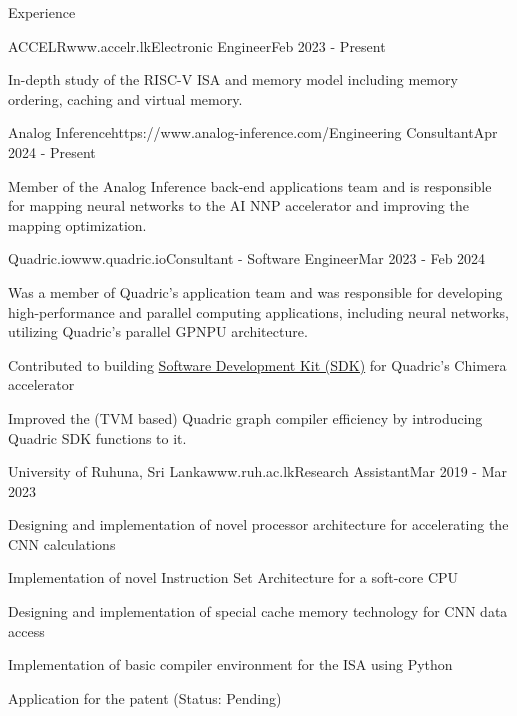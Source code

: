 \documentclass[
	11pt, %
]{./assets/resume} %
\begin{document}
\begin{rSection}{Experience}

	\begin{rSubsectionX}{ACCELR}{www.accelr.lk}{Electronic Engineer}{Feb 2023 - Present}
		\item In-depth study of the RISC-V ISA and memory model including memory ordering, caching and virtual memory.
	\end{rSubsectionX}

	\begin{rSubsectionX}{Analog Inference}{https://www.analog-inference.com/}{Engineering Consultant}{Apr 2024 - Present}
		\item Member of the Analog Inference back-end applications team and is responsible for mapping neural networks to the AI NNP accelerator and improving the mapping optimization.
	\end{rSubsectionX}

	\begin{rSubsectionX}{Quadric.io}{www.quadric.io}{Consultant - Software Engineer}{Mar 2023 - Feb 2024}
        \item Was a member of Quadric's application team and was responsible for developing high-performance and parallel computing applications, including neural networks, utilizing Quadric's parallel GPNPU architecture.
        \item Contributed to building \href{https://quadric.io/sdk/}{Software Development Kit (SDK)} for Quadric's Chimera accelerator
        \item Improved the (TVM based) Quadric graph compiler efficiency by introducing Quadric SDK functions to it.
    \end{rSubsectionX}

	\begin{rSubsectionX}{University of Ruhuna, Sri Lanka}{www.ruh.ac.lk}{Research Assistant}{Mar 2019 - Mar 2023}
		\item Designing and implementation of novel processor architecture for accelerating the CNN calculations
		\item Implementation of novel Instruction Set Architecture for a soft-core CPU
		\item Designing and implementation of special cache memory technology for CNN data access
		\item Implementation of basic compiler environment for the ISA using Python
		\item Application for the patent (Status: Pending)
	\end{rSubsectionX}


\end{rSection}
\end{document}
